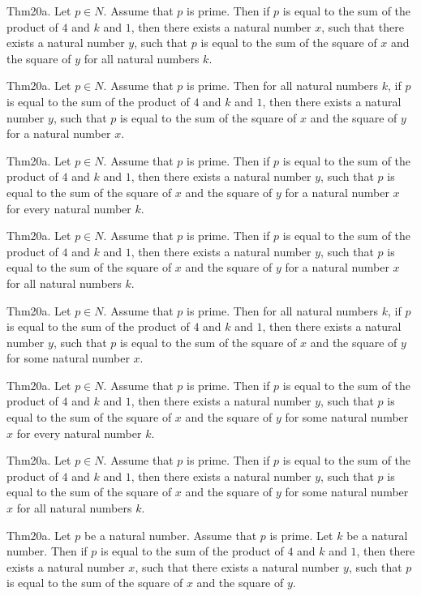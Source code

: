 \documentclass{article}
\begin{document}
Thm20a. Let $p \in N$. Assume that $p$ is prime. Then if $p$ is equal to the sum of the product of $4$ and $k$ and $1$, then there exists a natural number $x$, such that there exists a natural number $y$, such that $p$ is equal to the sum of the square of $x$ and the square of $y$ for all natural numbers $k$.

Thm20a. Let $p \in N$. Assume that $p$ is prime. Then for all natural numbers $k$, if $p$ is equal to the sum of the product of $4$ and $k$ and $1$, then there exists a natural number $y$, such that $p$ is equal to the sum of the square of $x$ and the square of $y$ for a natural number $x$.

Thm20a. Let $p \in N$. Assume that $p$ is prime. Then if $p$ is equal to the sum of the product of $4$ and $k$ and $1$, then there exists a natural number $y$, such that $p$ is equal to the sum of the square of $x$ and the square of $y$ for a natural number $x$ for every natural number $k$.

Thm20a. Let $p \in N$. Assume that $p$ is prime. Then if $p$ is equal to the sum of the product of $4$ and $k$ and $1$, then there exists a natural number $y$, such that $p$ is equal to the sum of the square of $x$ and the square of $y$ for a natural number $x$ for all natural numbers $k$.

Thm20a. Let $p \in N$. Assume that $p$ is prime. Then for all natural numbers $k$, if $p$ is equal to the sum of the product of $4$ and $k$ and $1$, then there exists a natural number $y$, such that $p$ is equal to the sum of the square of $x$ and the square of $y$ for some natural number $x$.

Thm20a. Let $p \in N$. Assume that $p$ is prime. Then if $p$ is equal to the sum of the product of $4$ and $k$ and $1$, then there exists a natural number $y$, such that $p$ is equal to the sum of the square of $x$ and the square of $y$ for some natural number $x$ for every natural number $k$.

Thm20a. Let $p \in N$. Assume that $p$ is prime. Then if $p$ is equal to the sum of the product of $4$ and $k$ and $1$, then there exists a natural number $y$, such that $p$ is equal to the sum of the square of $x$ and the square of $y$ for some natural number $x$ for all natural numbers $k$.

Thm20a. Let $p$ be a natural number. Assume that $p$ is prime. Let $k$ be a natural number. Then if $p$ is equal to the sum of the product of $4$ and $k$ and $1$, then there exists a natural number $x$, such that there exists a natural number $y$, such that $p$ is equal to the sum of the square of $x$ and the square of $y$.
\end{document}
